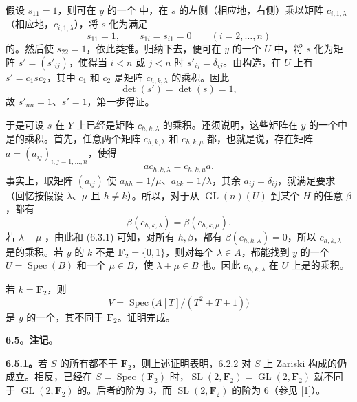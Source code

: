 假设 $s_{11}=1$，则可在 $y$ 的一个 中，在 $s$ 的左侧（相应地，右侧）乘以矩阵 $c_{i,1,\lambda}$（相应地，$c_{i,1,\lambda}$），将 $s$ 化为满足
\[
 s_{11}=1,\qquad s_{1i}=s_{i1}=0\qquad(i=2,\ldots,n)
\]
的。然后使 $s_{22}=1$，依此类推。归纳下去，便可在 $y$ 的一个  $U$ 中，将 $s$ 化为矩阵 $s'=(s'_{ij})$，使得当 $i<n$ 或 $j<n$ 时 $s'_{ij}=\delta_{ij}$。由构造，在 $U$ 上有 $s'=c_1sc_2$，其中 $c_1$ 和 $c_2$ 是矩阵 $c_{h,k,\lambda}$ 的乘积。因此
\[
 \det(s')=\det(s)=1,
\]
故 $s'_{nn}=1$、$s'=1$，第一步得证。

于是可设 $s$ 在 $Y$ 上已经是矩阵 $c_{h,k,\lambda}$ 的乘积。还须说明，这些矩阵在 $y$ 的一个中是的乘积。首先，任意两个矩阵
$c_{h,k,\lambda}$ 和 $c_{h,k,\mu}$ 都，也就是说，存在矩阵 $a=(a_{ij})_{i,j=1,\ldots,n}$，使得
\[
 ac_{h,k,\lambda}=c_{h,k,\mu}a.
\]
事实上，取矩阵 $(a_{ij})$ 使 $a_{hh}=1/\mu$、$a_{kk}=1/\lambda$，其余 $a_{ij}=\delta_{ij}$，就满足要求（回忆按假设 $\lambda$、$\mu$ 且 $h\ne k$）。所以，对于从 $\operatorname{GL}(n)(U)$ 到某个 $H$ 的任意 $\beta$，都有
\[
 \beta(c_{h,k,\lambda})=\beta(c_{h,k,\mu}).
\]
若 $\lambda+\mu$ ，由此和 (6.3.1) 可知，对所有 $h,\beta$，都有 $\beta(c_{h,k,\lambda})=0$，所以 $c_{h,k,\lambda}$ 是的乘积。若 $y$ 的 $k$ 不是 $\mathbf F_2=\{0,1\}$，则对每个 $\lambda\in A$，都能找到 $y$ 的一个  $U=\operatorname{Spec}(B)$ 和一个 $\mu\in B$，使 $\lambda+\mu\in B$ 也。因此 $c_{h,k,\lambda}$ 在 $U$ 上是的乘积。

若 $k=\mathbf F_2$，则
\[
 V=\operatorname{Spec}\bigl(A[T]/(T^2+T+1)\bigr)
\]
是 $y$ 的一个，其不同于 $\mathbf F_2$。证明完成。

\textbf{6.5。注记。}

\textbf{6.5.1。}若 $S$ 的所有都不于 $\mathbf F_2$，则上述证明表明，6.2.2 对 $S$ 上 Zariski 构成的仍成立。相反，已经在 $S=\operatorname{Spec}(\mathbf F_2)$ 时，$\operatorname{SL}(2,\mathbf F_2)=\operatorname{GL}(2,\mathbf F_2)$ 就不同于 $\operatorname{GL}(2,\mathbf F_2)$ 的。后者的阶为 $3$，而 $\operatorname{SL}(2,\mathbf F_2)$ 的阶为 $6$（参见 [1]）。

